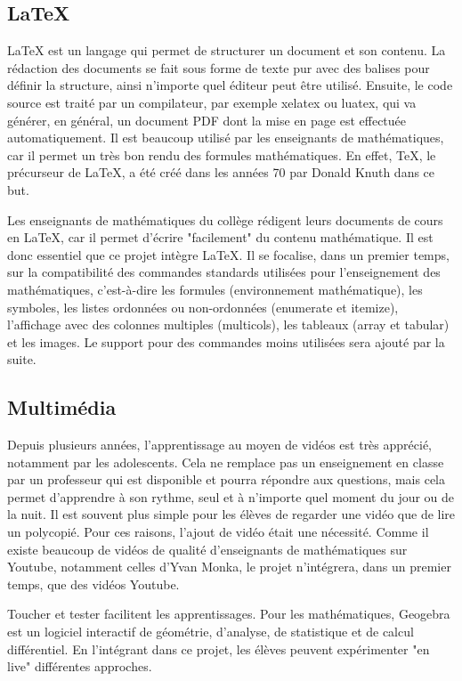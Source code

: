 \documentclass[12pt,titlepage,oneside]{article}
\renewcommand{\footnote}[1]{}
\begin{document}
\newpage

\subsection{LaTeX}
LaTeX est un langage qui permet de structurer un document et son contenu. La rédaction des documents se fait sous forme de texte pur avec des balises pour définir la structure, ainsi n'importe quel éditeur peut être utilisé. Ensuite, le code source est traité par un compilateur, par exemple xelatex ou luatex, qui va générer, en général, un document PDF dont la mise en page est effectuée automatiquement. Il est beaucoup utilisé par les enseignants de mathématiques, car il permet un très bon rendu des formules mathématiques. En effet, TeX, le précurseur de LaTeX, a été créé dans les années 70 par Donald Knuth dans ce but.\par

Les enseignants de mathématiques du collège rédigent leurs documents de cours en LaTeX, car il permet d'écrire "facilement" du contenu mathématique. Il est donc essentiel que ce projet intègre LaTeX. Il se focalise, dans un premier temps, sur la compatibilité des commandes standards utilisées pour l'enseignement des mathématiques, c'est-à-dire les formules (environnement mathématique), les symboles, les listes ordonnées ou non-ordonnées (enumerate et itemize), l'affichage avec des colonnes multiples (multicols), les tableaux (array et tabular) et les images. Le support pour des commandes moins utilisées sera ajouté par la suite.

\subsection{Multimédia}
Depuis plusieurs années, l'apprentissage au moyen de vidéos est très apprécié, notamment par les adolescents. Cela ne remplace pas un enseignement en classe par un professeur qui est disponible et pourra répondre aux questions, mais cela permet d'apprendre à son rythme, seul et à n'importe quel moment du jour ou de la nuit. Il est souvent plus simple pour les élèves de regarder une vidéo que de lire un polycopié. Pour ces raisons, l'ajout de vidéo était une nécessité. Comme il existe beaucoup de vidéos de qualité d'enseignants de mathématiques sur Youtube, notamment celles d'Yvan Monka\footnote{\url{https://www.youtube.com/@YMONKA}}, le projet n'intégrera, dans un premier temps, que des vidéos Youtube.\par
Toucher et tester facilitent les apprentissages. Pour les mathématiques, Geogebra est un logiciel interactif de géométrie, d'analyse, de statistique et de calcul différentiel. En l'intégrant dans ce projet, les élèves peuvent expérimenter "en live" différentes approches.
\end{document}
